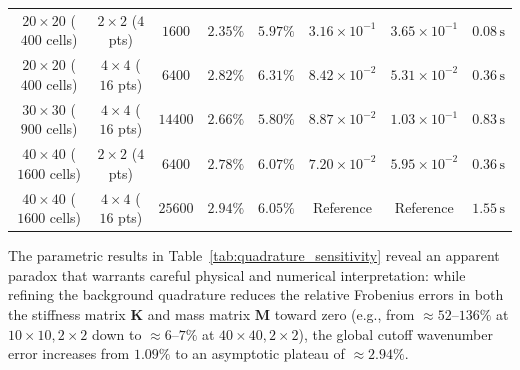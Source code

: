 \documentclass[preprint,12pt]{elsarticle}
\begin{document}
\begin{table}[!htbp]
{\begin{tabular}{@{} c c c c c c c c @{}}
            \midrule
            $20 \times 20$ ($400$ cells)  & $2 \times 2$ ($4$ pts)  & $1600$             & $2.35\%$                                      & $5.97\%$                                                & $3.16 \times 10^{-1}$                                                                  & $3.65 \times 10^{-1}$                                                                  & $0.08\,\mathrm{s}$          \\
            $20 \times 20$ ($400$ cells)  & $4 \times 4$ ($16$ pts) & $6400$             & $2.82\%$                                      & $6.31\%$                                                & $8.42 \times 10^{-2}$                                                                  & $5.31 \times 10^{-2}$                                                                  & $0.36\,\mathrm{s}$          \\
            \midrule
            $30 \times 30$ ($900$ cells)  & $4 \times 4$ ($16$ pts) & $14400$            & $2.66\%$                                      & $5.80\%$                                                & $8.87 \times 10^{-2}$                                                                  & $1.03 \times 10^{-1}$                                                                  & $0.83\,\mathrm{s}$          \\
            $40 \times 40$ ($1600$ cells) & $2 \times 2$ ($4$ pts)  & $6400$             & $2.78\%$                                      & $6.07\%$                                                & $7.20 \times 10^{-2}$                                                                  & $5.95 \times 10^{-2}$                                                                  & $0.36\,\mathrm{s}$          \\
            $40 \times 40$ ($1600$ cells) & $4 \times 4$ ($16$ pts) & $25600$            & $2.94\%$                                      & $6.05\%$                                                & Reference                                                                              & Reference                                                                              & $1.55\,\mathrm{s}$          \\
            \bottomrule
        \end{tabular}%
    }
\end{table}

The parametric results in Table~\ref{tab:quadrature_sensitivity} reveal an apparent paradox that warrants careful physical and numerical interpretation: while refining the background quadrature reduces the relative Frobenius errors in both the stiffness matrix $\mathbf{K}$ and mass matrix $\mathbf{M}$ toward zero (e.g., from $\approx 52\text{--}136\%$ at $10 \times 10, 2 \times 2$ down to $\approx 6\text{--}7\%$ at $40 \times 40, 2 \times 2$), the global cutoff wavenumber error increases from $1.09\%$ to an asymptotic plateau of $\approx 2.94\%$.
\end{document}
